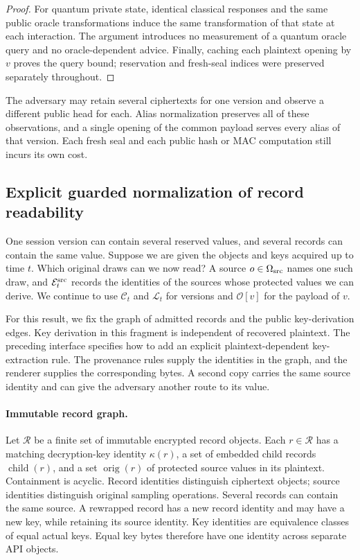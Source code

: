 \documentclass[pdflatex]{sn-jnl}
\theoremstyle{thmstyleone}
\theoremstyle{thmstylethree}
\theoremstyle{thmstyletwo}
\begin{document}
\begin{proof}
For quantum private state, identical classical responses and the same public
oracle transformations induce the same transformation of that state at
each interaction.  The argument introduces no measurement of a quantum
oracle query and no oracle-dependent advice.  Finally, caching each
plaintext opening by $v$ proves the query bound; reservation and fresh-seal
indices were preserved separately throughout.
\end{proof}

The adversary may retain several ciphertexts for one version and observe
a different public head for each. Alias normalization preserves all of
these observations, and a single opening of the common payload serves
every alias of that version. Each fresh seal and each public hash or MAC
computation still incurs its own cost.

\subsection{Explicit guarded normalization of record readability}
\label{sec:guarded-provenance}

One session version can contain several reserved values, and several
records can contain the same value. Suppose we are given the objects
and keys acquired up to time $t$. Which original draws can we now read?
A source $o\in\Omega_{\rm src}$ names one such draw, and
$\mathcal E^{\rm src}_t$ records the identities of the sources whose
protected values we can derive. We continue to use $\mathcal C_t$ and
$\mathcal L_t$ for versions and $\mathcal O[v]$ for the payload of $v$.

For this result, we fix the graph of admitted records and the public key-derivation
edges. Key derivation in this fragment is independent of recovered
plaintext. The preceding interface specifies how to add an explicit
plaintext-dependent key-extraction rule. The provenance rules supply
the identities in the graph, and the renderer supplies the corresponding
bytes. A second copy carries the same source identity and can give the
adversary another route to its value.

\paragraph{Immutable record graph.}
Let $\mathcal R$ be a finite set of immutable encrypted record objects.
Each $r\in\mathcal R$ has a matching decryption-key identity $\kappa(r)$,
a set of embedded child records $\operatorname{child}(r)$, and a set
$\operatorname{orig}(r)$ of protected source values in its plaintext.
Containment is acyclic.  Record identities distinguish ciphertext objects;
source identities distinguish original sampling operations.  Several
records can contain the same source.  A rewrapped record has a new record
identity and may have a new key, while retaining its source identity.
Key identities are equivalence classes of equal actual keys. Equal key bytes
therefore have one identity across separate API objects.
\end{document}
